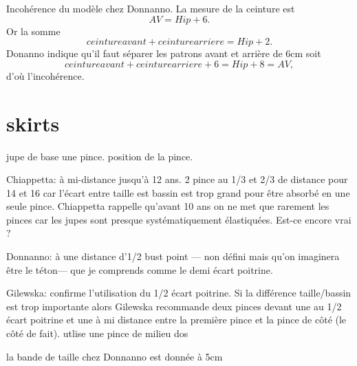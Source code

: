 \documentclass[10pt,a4paper,twoside]{report}
\begin{document}
Incohérence du modèle chez Donnanno. La mesure de la ceinture est
$$AV = Hip + 6.$$
Or la somme
$$ceinture avant + ceinture arriere = Hip +2.$$
Donanno indique qu'il faut séparer les patrons avant et arrière de 6cm soit
$$ceinture avant + ceinture arriere + 6 = Hip +8 = AV,$$
d'où l'incohérence.

\section{skirts}

jupe de base une pince. position de la pince.

Chiappetta: à mi-distance jusqu'à 12 ans. 2 pince au 1/3 et 2/3 de distance pour 14 et 16 car l'écart entre taille est bassin est trop grand pour être absorbé en une seule pince. Chiappetta rappelle qu'avant 10 ans on ne met que rarement les pinces car les jupes sont presque systématiquement élastiquées. Est-ce encore vrai ?

Donnanno: à une distance d'1/2 bust point --- non défini mais qu'on imaginera être le téton--- que je comprends comme le demi écart poitrine.

Gilewska: confirme l'utilisation du 1/2 écart poitrine. Si la différence taille/bassin est trop importante alors Gilewska recommande deux pinces devant une au 1/2 écart poitrine et une à mi distance entre la première pince et la pince de côté (le côté de fait). utlise une pince de milieu dos

la bande de taille chez Donnanno est donnée à 5cm



\end{document}
